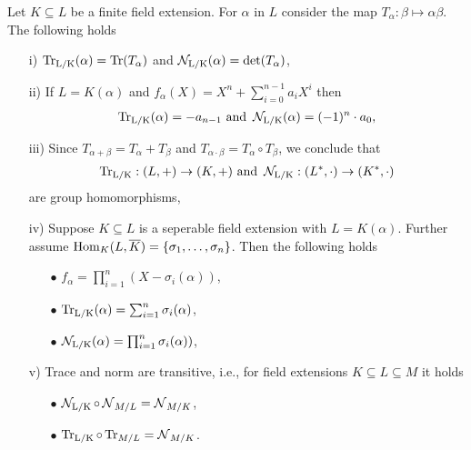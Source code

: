\begin{remin}
	Let $K\subseteq L$ be a finite field extension. For $\alpha$ in $L$ consider the map $T_\alpha: \beta\mapsto \alpha\beta$. The following holds
	\begin{itemize}
		\item [i)] $\operatorname{Tr_{L/K}}(\alpha)=\operatorname{Tr}(T_\alpha)$ and $\operatorname{\mathcal{N}_{L/K}}(\alpha)=\det(T_\alpha)$,
		\item [ii)] If $L=K(\alpha)$ and $f_\alpha(X)=X^n+\sum_{i=0}^{n-1}a_i X^i$ then \begin{align*}
			\operatorname{Tr_{L/K}}(\alpha)=-a_{n-1} \mathrm{~and~} \operatorname{\mathcal{N}_{L/K}}(\alpha)=(-1)^{n}\cdot a_0,
		\end{align*}
		\item [iii)] Since $T_{\alpha+\beta}=T_\alpha+T_\beta$ and $T_{\alpha\cdot\beta}=T_\alpha\circ T_\beta$, we conclude that 
		\begin{align*}
			\operatorname{Tr_{L/K}}: (L,+)\to (K,+) \mathrm{~and~} \operatorname{\mathcal{N}_{L/K}}:(L^*,\cdot)\to (K^*,\cdot)
		\end{align*}
		are group homomorphisms,
		\item [iv)] Suppose $K\subseteq L$ is a seperable field extension with $L=K(\alpha)$. Further assume $\operatorname{Hom}_K(L,\overline{K})=\{\sigma_1,\dots,\sigma_n \}$. Then the following holds
		\begin{itemize}
			\item [$\bullet$] $f_\alpha= \prod_{i=1}^{n} (X-\sigma_i(\alpha))$,
			\item [$\bullet$] $\operatorname{Tr_{L/K}}(\alpha)=\sum_{i=1}^{n} \sigma_i(\alpha)$,
			\item [$\bullet$] $\operatorname{\mathcal{N}_{L/K}}(\alpha)=\prod_{i=1}^{n}\sigma_i(\alpha))$,
		\end{itemize} 
		\item [v)] Trace and norm are transitive, i.e., for field extensions $K\subseteq L\subseteq M$ it holds
		\begin{itemize}
			\item [$\bullet$] $\operatorname{\mathcal{N}_{L/K}}\circ \operatorname{\mathcal{N}}_{M/L}=\operatorname{\mathcal{N}}_{M/K}$,
			\item [$\bullet$] $\operatorname{Tr_{L/K}}\circ\operatorname{Tr}_{M/L}=\operatorname{\mathcal{N}}_{M/K}$.
		\end{itemize} 
	\end{itemize}
\end{remin}

